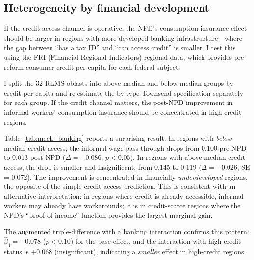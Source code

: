 \documentclass[12pt]{article}
\begin{document}
\subsection{Heterogeneity by financial development}

If the credit access channel is operative, the NPD's consumption insurance effect should be larger in regions with more developed banking infrastructure---where the gap between ``has a tax ID'' and ``can access credit'' is smaller. I test this using the FRI (Financial-Regional Indicators) regional data, which provides pre-reform consumer credit per capita for each federal subject.

I split the 32 RLMS oblasts into above-median and below-median groups by credit per capita and re-estimate the by-type Townsend specification separately for each group. If the credit channel matters, the post-NPD improvement in informal workers' consumption insurance should be concentrated in high-credit regions.

Table~\ref{tab:mech_banking} reports a surprising result. In regions with \textit{below}-median credit access, the informal wage pass-through drops from 0.100 pre-NPD to 0.013 post-NPD ($\Delta = -0.086$, $p < 0.05$). In regions with above-median credit access, the drop is smaller and insignificant: from 0.145 to 0.119 ($\Delta = -0.026$, SE = 0.072). The improvement is concentrated in financially \textit{underdeveloped} regions, the opposite of the simple credit-access prediction. This is consistent with an alternative interpretation: in regions where credit is already accessible, informal workers may already have workarounds; it is in credit-scarce regions where the NPD's ``proof of income'' function provides the largest marginal gain.

The augmented triple-difference with a banking interaction confirms this pattern: $\hat{\beta}_4 = -0.078$ ($p < 0.10$) for the base effect, and the interaction with high-credit status is $+0.068$ (insignificant), indicating a \textit{smaller} effect in high-credit regions.
\end{document}
